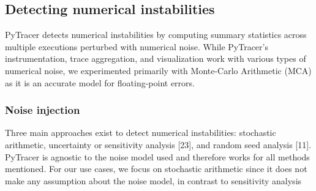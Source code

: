 \documentclass[11pt]{article}
\newcommand{\tristan}[1]{\color{orange}\textbf{From Tristan:} #1\color{black}\xspace}
\newcommand{\Yohan}[1]{\color{green!75!black}\textbf{Yohan:} #1\color{black}\xspace}
\newcommand{\pytracer}[0]{PyTracer\xspace}
\begin{document}

\subsection{Detecting numerical instabilities}

\pytracer detects numerical instabilities by computing summary statistics across multiple executions perturbed with numerical noise. While \pytracer's instrumentation, trace aggregation, and visualization work with various types of numerical noise, we experimented primarily with Monte-Carlo Arithmetic (MCA) as it is an accurate model for floating-point errors.

\subsubsection{Noise injection}
\label{sec:fuzzy}

Three  main  approaches  exist  to  detect  numerical  instabilities:  stochastic  arithmetic,  uncertainty  or  sensitivity analysis [23], and random seed analysis [11].  PyTracer is agnostic to the noise model used and therefore works for all methods mentioned.  For our use cases, we focus on stochastic arithmetic since it does not make any assumption about the noise model, in contrast to sensitivity analysis
\end{document}
